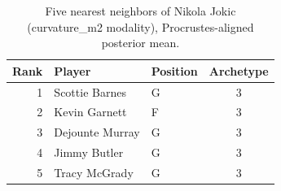 \begin{table}[htbp]
  \centering\small
  \begin{tabular}{rllc}
    \toprule
    Rank & Player & Position & Archetype \\
    \midrule
    1 & Scottie Barnes & G & 3 \\
    2 & Kevin Garnett & F & 3 \\
    3 & Dejounte Murray & G & 3 \\
    4 & Jimmy Butler & G & 3 \\
    5 & Tracy McGrady & G & 3 \\
    \bottomrule
  \end{tabular}
  \caption{Five nearest neighbors of Nikola Jokic (curvature_m2 modality), Procrustes-aligned posterior mean.}
  \label{tab:Nikola_Jokic_neighbors_curvature_m2}
\end{table}

